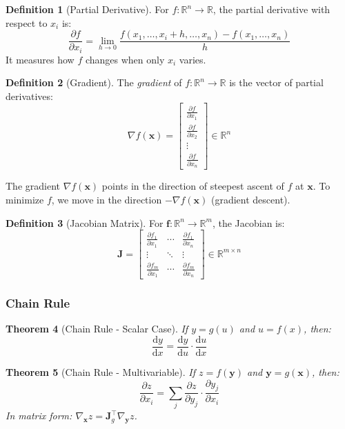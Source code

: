 \documentclass[11pt,twoside]{article}
\numberwithin{equation}{section}
\newcommand{\R}{\mathbb{R}}
\newcommand{\vect}[1]{\bm{#1}}
\newcommand{\mat}[1]{\bm{#1}}
\newcommand{\dd}[2]{\frac{\mathrm{d}#1}{\mathrm{d}#2}}
\newcommand{\pp}[2]{\frac{\partial #1}{\partial #2}}
\theoremstyle{plain}
\newtheorem{theorem}{Theorem}[section]
\theoremstyle{definition}
\newtheorem{definition}[theorem]{Definition}
\theoremstyle{remark}
\newenvironment{keyidea}{
  \begin{tcolorbox}[colback=yellow!5!white,
                    colframe=yellow!50!black,
                    title=Key Idea,
                    breakable,
                    enhanced,
                    sharp corners,
                    boxrule=0.8pt,
                    left=6pt, right=6pt, top=6pt, bottom=6pt]
}{
  \end{tcolorbox}
}
\begin{document}
\begin{definition}[Partial Derivative]
For $f: \R^n \to \R$, the partial derivative with respect to $x_i$ is:
\[
\pp{f}{x_i} = \lim_{h \to 0} \frac{f(x_1, \ldots, x_i+h, \ldots, x_n) - f(x_1, \ldots, x_n)}{h}
\]
It measures how $f$ changes when only $x_i$ varies.
\end{definition}

\begin{definition}[Gradient]
The \emph{gradient} of $f: \R^n \to \R$ is the vector of partial derivatives:
\[
\nabla f(\vect{x}) = \begin{bmatrix}
\pp{f}{x_1} \\
\pp{f}{x_2} \\
\vdots \\
\pp{f}{x_n}
\end{bmatrix} \in \R^n
\]
\end{definition}

\begin{keyidea}
The gradient $\nabla f(\vect{x})$ points in the direction of steepest ascent of $f$ at $\vect{x}$. To minimize $f$, we move in the direction $-\nabla f(\vect{x})$ (gradient descent).
\end{keyidea}

\begin{definition}[Jacobian Matrix]
For $\vect{f}: \R^n \to \R^m$, the Jacobian is:
\[
\mat{J} = \begin{bmatrix}
\pp{f_1}{x_1} & \cdots & \pp{f_1}{x_n} \\
\vdots & \ddots & \vdots \\
\pp{f_m}{x_1} & \cdots & \pp{f_m}{x_n}
\end{bmatrix} \in \R^{m \times n}
\]
\end{definition}

\subsubsection{Chain Rule}

\begin{theorem}[Chain Rule - Scalar Case]
If $y = g(u)$ and $u = f(x)$, then:
\[
\dd{y}{x} = \dd{y}{u} \cdot \dd{u}{x}
\]
\end{theorem}

\begin{theorem}[Chain Rule - Multivariable]
If $z = f(\vect{y})$ and $\vect{y} = g(\vect{x})$, then:
\[
\pp{z}{x_i} = \sum_j \pp{z}{y_j} \cdot \pp{y_j}{x_i}
\]
In matrix form: $\nabla_{\vect{x}} z = \mat{J}_g^\top \nabla_{\vect{y}} z$.
\end{theorem}
\end{document}
